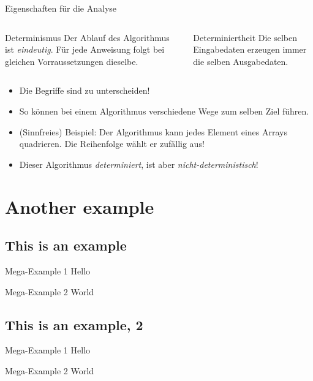 \documentclass[aspectratio=169,usepdftitle=true,t]{beamer}
\newcommand\twosplit[3][t]{%
    \begin{columns}[#1]
    \begin{column}{0.475\linewidth}
        #2
    \end{column}\hfill
    \begin{column}{0.475\linewidth}
        #3
    \end{column}
    \end{columns}
}
\begin{document}
\begin{frame}{Eigenschaften für die Analyse}
    \twosplit{%
    \begin{block}{Determinismus}
        Der Ablauf des Algorithmus ist \emph{eindeutig}. Für jede Anweisung folgt bei gleichen Vorraussetzungen dieselbe.
    \end{block}
    }{%
    \begin{block}{Determiniertheit}
        Die selben Eingabedaten erzeugen immer die selben Ausgabedaten.
    \end{block}
    }\bigskip
    \begin{itemize}
        \item Die Begriffe sind zu unterscheiden!
        \item So können bei einem Algorithmus verschiedene Wege zum selben Ziel führen.
        \item (Sinnfreies) Beispiel: Der Algorithmus kann jedes Element eines Arrays quadrieren. Die Reihenfolge wählt er zufällig aus!
        \item Dieser Algorithmus \emph{determiniert}, ist aber \emph{nicht-deterministisch}!
    \end{itemize}
\end{frame}


\section{Another example}
\subsection{This is an example}

\begin{frame}{Mega-Example 1}
    Hello
\end{frame}

\begin{frame}{Mega-Example 2}
    World
\end{frame}

\subsection{This is an example, 2}

\begin{frame}{Mega-Example 1}
    Hello
\end{frame}

\begin{frame}{Mega-Example 2}
    World
\end{frame}
\end{document}
